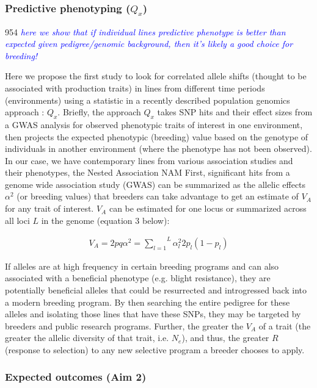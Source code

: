 \documentclass[12pt]{article}
\newcommand{\jri}[1]{\textcolor{blue}{ \emph{\scriptsize  #1}} }
\begin{document}
\subsubsection*{Predictive phenotyping ($Q_{x}$)}954
\jri{here we show that if individual lines predictive phenotype is better than expected given pedigree/genomic background, then it's likely a good choice for breeding! }

Here we propose the first study to look for correlated allele shifts (thought to be associated with production traits) in lines from different time periods (environments) using a statistic in a recently described population genomics approach \cite{Berg:2014bs}: $Q_{x}$. 
Briefly, the approach $Q_{x}$ takes SNP hits and their effect sizes from a GWAS analysis for observed phenotypic traits of interest in one environment, then projects the expected phenotypic (breeding) value based on the genotype of individuals in another environment (where the phenotype has not been observed). 
In our case, we have contemporary lines from various association studies and their phenotypes, the Nested Association  NAM 
First, significant hits from a genome wide association study (GWAS)  can be summarized as the allelic effects $\alpha^{2}$ (or breeding values) that breeders can take advantage to get an estimate of $V_{A}$ for any trait of interest. $V_{A}$ can be estimated for one locus or summarized across all loci $L$ in the genome (equation 3 below):

  \begin{align}
    V_A = 2pq\alpha^2
     = \overset{L}{\underset{l=1}{\sum}}\alpha^2_l2p_l(1-p_l)
  \end{align}

If alleles are at high frequency in certain breeding programs and can also associated with a beneficial phenotype (e.g. blight resistance), they are potentially beneficial alleles that could be resurrected and introgressed back into a modern breeding program. 
By then searching the entire pedigree for these alleles and isolating those lines that have these SNPs, they may be targeted by breeders and public research programs.
Further, the greater the $V_A$ of a trait (the greater the allelic diversity of that trait, i.e. $N_{e}$), and thus, the greater $R$ (response to selection) to any new selective program a breeder chooses to apply.


\subsubsection*{Expected outcomes (Aim 2)}
\end{document}
